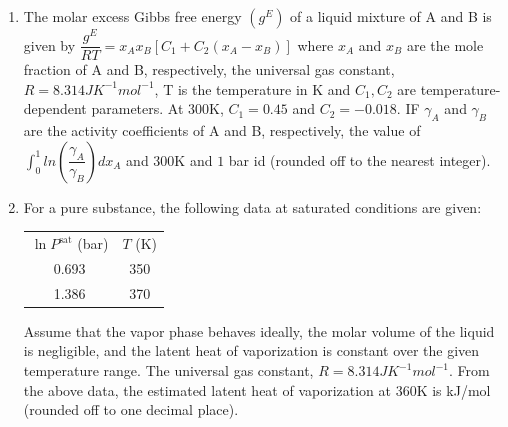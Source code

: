 \documentclass[journal]{IEEEtran}
\numberwithin{equation}{enumi}
\numberwithin{figure}{enumi}
\begin{document}
\begin{enumerate}[start=1, label={Q\arabic*.}]
\item The molar excess Gibbs free energy $(g^E)$ of a liquid mixture of A and B is given by $\dfrac{g^E}{RT}=x_A x_B [C_1+C_2(x_A-x_B)]$ where $x_A$ and $x_B$ are the mole fraction of A and B, respectively, the universal gas constant, $R=8.314J K^{-1} mol^{-1} $, T is the temperature in K and $C_1,C_2$ are temperature-dependent parameters. At $300$K, $C_1=0.45$ and $C_2=-0.018$. IF $\gamma_A$ and $\gamma_B$ are the activity coefficients of A and B, respectively, the value of $\int ^1_0ln(\dfrac{\gamma_A}{\gamma_B})dx_A$ and $300$K and $1$ bar id \underline{\hspace{1.5cm}} (rounded off to the nearest integer).

\item For a pure substance, the following data at saturated conditions are given: 
\begin{center}
\begin{tabular}{cc}

$\ln P^{\text{sat}}$ (bar) & $T$ (K) \\

0.693 & 350 \\
1.386 & 370 \\

\end{tabular}
\end{center}
Assume that the vapor phase behaves ideally, the molar volume of the liquid is negligible, and the latent heat of vaporization is constant over the given temperature range. The universal gas constant, $R=8.314 J K^{-1}mol^{-1} $. From the above data, the estimated latent heat of vaporization at 360K is \underline{\hspace{1.5cm}} kJ/mol (rounded off to one decimal place). 


\end{enumerate}
\end{document}
